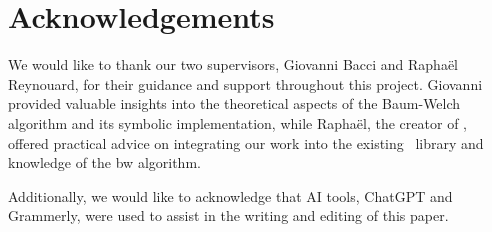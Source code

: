 \section{Acknowledgements}\label{sec:acknowledgements}
We would like to thank our two supervisors, Giovanni Bacci and Raphaël Reynouard, for their guidance and support throughout this project.
Giovanni provided valuable insights into the theoretical aspects of the Baum-Welch algorithm and its symbolic implementation, while Raphaël, the creator of \Jajapy, offered practical advice on integrating our work into the existing \Jajapy\ library and knowledge of the \gls{bw} algorithm.

Additionally, we would like to acknowledge that AI tools, ChatGPT and Grammerly, were used to assist in the writing and editing of this paper.
